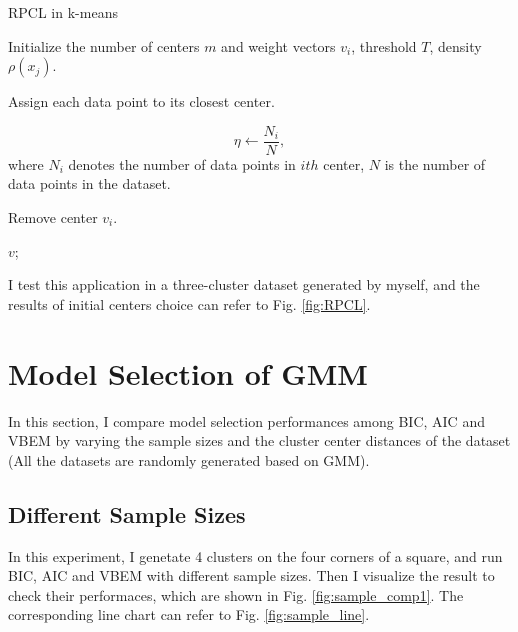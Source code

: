 \documentclass[12pt,a4paper]{article}
\theoremstyle{definition}
\begin{document}
\begin{algorithm}[H]
	\caption{RPCL in k-means}
	\label{alg:RPCL}
	\vspace{0.25\baselineskip}
	
	Initialize the number of centers $m$ and weight vectors $v_{i}$, threshold $T$, density $\rho(x_{j})$.
	
	 {
	}
	
	Assign each data point to its closest center.
	
	 {
		\begin{equation*}
			\eta \leftarrow \dfrac{N_{i}}{N},
		\end{equation*}
		where $N_{i}$ denotes the number of data points in $ith$ center, $N$ is the number of data points in the dataset.
		
		 {
			Remove center $v_{i}$.
		}
	}

	\Return $v$;
\end{algorithm}

I test this application in a three-cluster dataset generated by myself, and the results of initial centers choice can refer to Fig. \ref{fig:RPCL}.
\section{Model Selection of GMM}

In this section, I compare model selection performances among BIC, AIC and VBEM by varying the sample sizes and the cluster center distances of the dataset (All the datasets are randomly generated based on GMM).

\subsection{Different Sample Sizes}
\label{sec:1}
In this experiment, I genetate 4 clusters on the four corners of a square, and run BIC, AIC and VBEM with different sample sizes. Then I visualize the result to check their performaces, which are shown in Fig. \ref{fig:sample_comp1}. The corresponding line chart can refer to Fig. \ref{fig:sample_line}.
\end{document}
